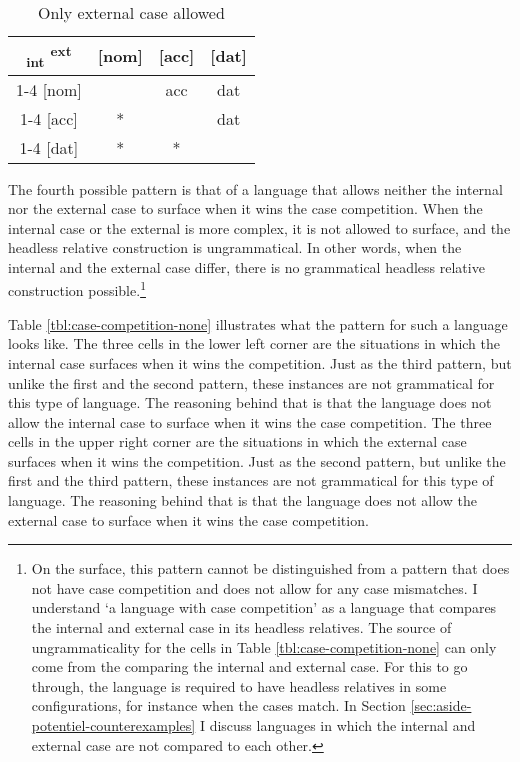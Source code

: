 \begin{table}[H]
  \center
  \caption{Only external case allowed}
  \begin{tabular}{c|c|c|c}
    \toprule
    \textsubscript{\ac{int}} \textsuperscript{\ac{ext}}
           & [\ac{nom}]
           & [\ac{acc}]
           & [\ac{dat}]
           \\ \cmidrule{1-4}
       [\ac{nom}]
           & \xcancel{\phantom{xx}}
           & \ac{acc}
           & \ac{dat}
           \\ \cmidrule{1-4}
       [\ac{acc}]
           & *
           & \xcancel{\phantom{xx}}
           & \ac{dat}
           \\ \cmidrule{1-4}
       [\ac{dat}]
           & *
           & *
           & \xcancel{\phantom{xx}}
           \\
     \bottomrule
  \end{tabular}
    \label{tbl:case-competition-only-ext}
\end{table}

The fourth possible pattern is that of a language that allows neither the internal nor the external case to surface when it wins the case competition. When the internal case or the external is more complex, it is not allowed to surface, and the headless relative construction is ungrammatical. In other words, when the internal and the external case differ, there is no grammatical headless relative construction possible.\footnote{
On the surface, this pattern cannot be distinguished from a pattern that does not have case competition and does not allow for any case mismatches. I understand `a language with case competition' as a language that compares the internal and external case in its headless relatives. The source of ungrammaticality for the cells in Table \ref{tbl:case-competition-none} can only come from the comparing the internal and external case. For this to go through, the language is required to have headless relatives in some configurations, for instance when the cases match. In Section \ref{sec:aside-potentiel-counterexamples} I discuss languages in which the internal and external case are not compared to each other.
}

Table \ref{tbl:case-competition-none} illustrates what the pattern for such a language looks like.
The three cells in the lower left corner are the situations in which the internal case surfaces when it wins the competition. Just as the third pattern, but unlike the first and the second pattern, these instances are not grammatical for this type of language. The reasoning behind that is that the language does not allow the internal case to surface when it wins the case competition.
The three cells in the upper right corner are the situations in which the external case surfaces when it wins the competition. Just as the second pattern, but unlike the first and the third pattern, these instances are not grammatical for this type of language. The reasoning behind that is that the language does not allow the external case to surface when it wins the case competition.

